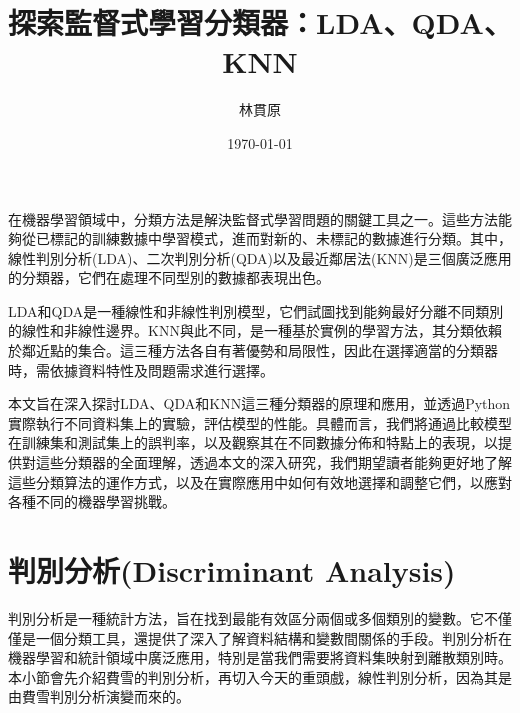 \documentclass[12pt, a4paper]{article}
\title{探索監督式學習分類器：LDA、QDA、KNN}
\author{{\KT 林貫原}}
\date{{\R \today }}
\begin{document}
\renewcommand{\tablename}{表}	
\renewcommand{\figurename}{圖}
\maketitle
\fontsize{12}{22pt}\selectfont 


在機器學習領域中，分類方法是解決監督式學習問題的關鍵工具之一。這些方法能夠從已標記的訓練數據中學習模式，進而對新的、未標記的數據進行分類。其中，線性判別分析(LDA)、二次判別分析(QDA)以及最近鄰居法(KNN)是三個廣泛應用的分類器，它們在處理不同型別的數據都表現出色。

LDA和QDA是一種線性和非線性判別模型，它們試圖找到能夠最好分離不同類別的線性和非線性邊界。KNN與此不同，是一種基於實例的學習方法，其分類依賴於鄰近點的集合。這三種方法各自有著優勢和局限性，因此在選擇適當的分類器時，需依據資料特性及問題需求進行選擇。

本文旨在深入探討LDA、QDA和KNN這三種分類器的原理和應用，並透過Python實際執行不同資料集上的實驗，評估模型的性能。具體而言，我們將通過比較模型在訓練集和測試集上的誤判率，以及觀察其在不同數據分佈和特點上的表現，以提供對這些分類器的全面理解，透過本文的深入研究，我們期望讀者能夠更好地了解這些分類算法的運作方式，以及在實際應用中如何有效地選擇和調整它們，以應對各種不同的機器學習挑戰。

\section{判別分析(Discriminant Analysis)}
判別分析是一種統計方法，旨在找到最能有效區分兩個或多個類別的變數。它不僅僅是一個分類工具，還提供了深入了解資料結構和變數間關係的手段。判別分析在機器學習和統計領域中廣泛應用，特別是當我們需要將資料集映射到離散類別時。本小節會先介紹費雪的判別分析，再切入今天的重頭戲，線性判別分析，因為其是由費雪判別分析演變而來的。
\end{document}
